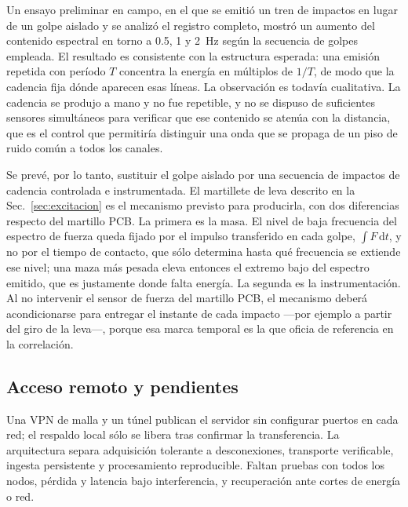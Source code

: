 Un ensayo preliminar en campo, en el que se emitió un tren de impactos en lugar de un
golpe aislado y se analizó el registro completo, mostró un aumento del contenido
espectral en torno a \SI{0.5}{}, \SI{1}{} y \SI{2}{\hertz} según la secuencia de golpes
empleada. El resultado es consistente con la estructura esperada: una emisión repetida
con período $T$ concentra la energía en múltiplos de $1/T$, de modo que la cadencia fija
dónde aparecen esas líneas. La observación es todavía cualitativa. La cadencia se produjo
a mano y no fue repetible, y no se dispuso de suficientes sensores simultáneos para
verificar que ese contenido se atenúa con la distancia, que es el control que permitiría
distinguir una onda que se propaga de un piso de ruido común a todos los canales.

Se prevé, por lo tanto, sustituir el golpe aislado por una secuencia de impactos de
cadencia controlada e instrumentada. El martillete de leva descrito en la
Sec.~\ref{sec:excitacion} es el mecanismo previsto para producirla, con dos diferencias
respecto del martillo PCB. La primera es la masa. El nivel de baja frecuencia del
espectro de fuerza queda fijado por el impulso transferido en cada golpe,
$\int\!F\,\mathrm{d}t$, y no por el tiempo de contacto, que sólo determina hasta qué
frecuencia se extiende ese nivel; una maza más pesada eleva entonces el extremo bajo del
espectro emitido, que es justamente donde falta energía. La segunda es la
instrumentación. Al no intervenir el sensor de fuerza del martillo PCB, el mecanismo
deberá acondicionarse para entregar el instante de cada impacto ---por ejemplo a partir
del giro de la leva---, porque esa marca temporal es la que oficia de referencia en la
correlación.

\subsection{Acceso remoto y pendientes}

Una VPN de malla y un túnel publican el servidor sin configurar puertos en cada red; el
respaldo local sólo se libera tras confirmar la transferencia. La arquitectura separa
adquisición tolerante a desconexiones, transporte verificable, ingesta persistente y
procesamiento reproducible. Faltan pruebas con todos los nodos, pérdida y latencia bajo
interferencia, y recuperación ante cortes de energía o red.
